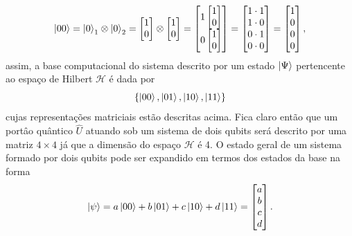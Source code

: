 \documentclass{article}
\begin{document}
\begin{equation}
    \ket{00} = \ket{0}_1 \otimes \ket{0}_2 = 
    \begin{bmatrix}
    1\\
    0
    \end{bmatrix}
    \otimes\begin{bmatrix}
    1\\
    0
    \end{bmatrix} = 
    \begin{bmatrix}
    1\begin{bmatrix}
    1\\
    0
    \end{bmatrix}\\
    0\begin{bmatrix}
    1\\
    0
    \end{bmatrix}
    \end{bmatrix} = \begin{bmatrix}
    1 \cdot 1\\
    1 \cdot 0\\
    0 \cdot 1\\
    0 \cdot 0\\
    \end{bmatrix} = \begin{bmatrix}
    1\\
    0\\
    0\\
    0\\
    \end{bmatrix},
\end{equation}
assim, a base computacional do sistema descrito por um estado $\ket{\Psi}$ pertencente ao espaço de Hilbert $\mathcal{H}$ é dada por
\begin{equation}
    \{ \ket{00},\ket{01},\ket{10},\ket{11} \}
\end{equation}
cujas representações matriciais estão descritas acima. Fica claro então que um portâo quântico $\hat{U}$ atuando sob um sistema de dois qubits será descrito por uma matriz $4\times 4$ já que a dimensão do espaço $\mathcal{H}$ é 4. O estado geral de um sistema formado por dois qubits pode ser expandido em termos dos estados da base na forma
\begin{equation}
    \ket{\psi} = a\ket{00} + b\ket{01} + c\ket{10} + d\ket{11} = \begin{bmatrix}
    a\\
    b\\
    c\\
    d\\
    \end{bmatrix}.
    \label{estadogeral}
\end{equation}
\end{document}
